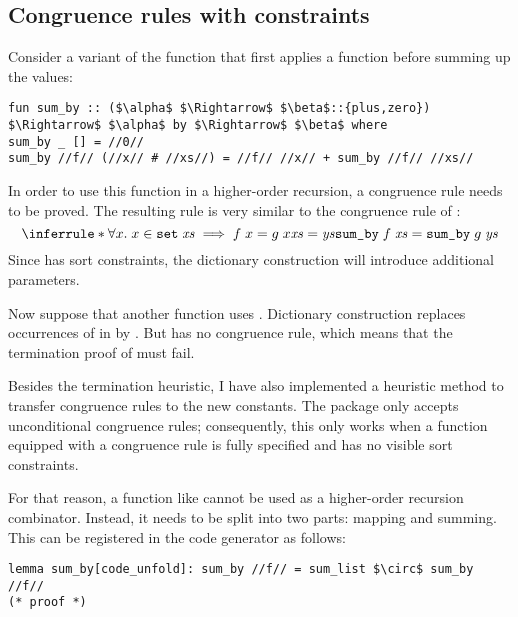 \subsection{Congruence rules with constraints}

Consider a variant of the  function that first applies a function before summing up the values:
%
\begin{lstlisting}
fun sum_by :: ($\alpha$ $\Rightarrow$ $\beta$::{plus,zero}) $\Rightarrow$ $\alpha$ by $\Rightarrow$ $\beta$ where
sum_by _ [] = //0//
sum_by //f// (//x// # //xs//) = //f// //x// + sum_by //f// //xs//
\end{lstlisting}
%
In order to use this function in a higher-order recursion, a congruence rule needs to be proved.
The resulting rule is very similar to the congruence rule of :
\[
  \inferrule*{
    \forall x.\; x \in \holconst{set}\;\mathit{xs} \implies f\;x = g\;x\\
    \mathit{xs} = \mathit{ys}
  }{\holconst{sum\_by}\;f\;\mathit{xs} = \holconst{sum\_by}\;g\;\mathit{ys}}
\]
%
Since  has sort constraints, the dictionary construction will introduce additional parameters.

Now suppose that another function  uses .
Dictionary construction replaces occurrences of  in  by .
But  has no congruence rule, which means that the termination proof of  must fail.

Besides the termination heuristic, I have also implemented a heuristic method to transfer congruence rules to the new constants.
The  package only accepts unconditional congruence rules; consequently, this only works when a function equipped with a congruence rule is fully specified and has no visible sort constraints.

For that reason, a function like  cannot be used as a higher-order recursion combinator.
Instead, it needs to be split into two parts: mapping and summing.
This can be registered in the code generator as follows:
%
\begin{lstlisting}
lemma sum_by[code_unfold]: sum_by //f// = sum_list $\circ$ sum_by //f//
(* proof *)
\end{lstlisting}

